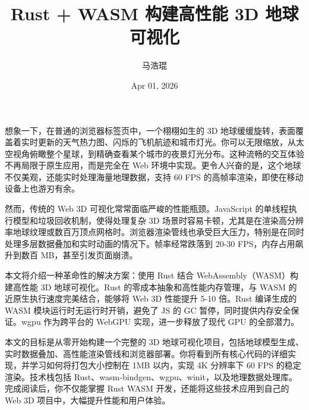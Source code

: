 \title{Rust + WASM 构建高性能 3D 地球可视化}
\author{马浩琨}
\date{Apr 01, 2026}
\maketitle
想象一下，在普通的浏览器标签页中，一个栩栩如生的 3D 地球缓缓旋转，表面覆盖着实时更新的天气热力图、闪烁的飞机航迹和城市灯光。你可以无限缩放，从太空视角俯瞰整个星球，到精确查看某个城市的夜景灯光分布。这种流畅的交互体验不再局限于原生应用，而是完全在 Web 环境中实现。更令人兴奋的是，这个地球不仅美观，还能实时处理海量地理数据，支持 60 FPS 的高帧率渲染，即使在移动设备上也游刃有余。\par
然而，传统的 Web 3D 可视化常常面临严峻的性能瓶颈。JavaScript 的单线程执行模型和垃圾回收机制，使得处理复杂 3D 场景时容易卡顿，尤其是在渲染高分辨率地球纹理或数百万顶点网格时。浏览器渲染管线也承受巨大压力，特别是在同时处理多层数据叠加和实时动画的情况下。帧率经常跌落到 20-30 FPS，内存占用飙升到数百 MB，甚至引发页面崩溃。\par
本文将介绍一种革命性的解决方案：使用 Rust 结合 WebAssembly（WASM）构建高性能 3D 地球可视化。Rust 的零成本抽象和高性能内存管理，与 WASM 的近原生执行速度完美结合，能够将 Web 3D 性能提升 5-10 倍。Rust 编译生成的 WASM 模块运行时无运行时开销，避免了 JS 的 GC 暂停，同时提供内存安全保证。wgpu 作为跨平台的 WebGPU 实现，进一步释放了现代 GPU 的全部潜力。\par
本文的目标是从零开始构建一个完整的 3D 地球可视化项目，包括地球模型生成、实时数据叠加、高性能渲染管线和浏览器部署。你将看到所有核心代码的详细实现，并学习如何将打包大小控制在 1MB 以内，实现 4K 分辨率下 60 FPS 的稳定渲染。技术栈包括 Rust、wasm-bindgen、wgpu、winit，以及地理数据处理库。完成阅读后，你不仅能掌握 Rust WASM 开发，还能将这些技术应用到自己的 Web 3D 项目中，大幅提升性能和用户体验。\par
